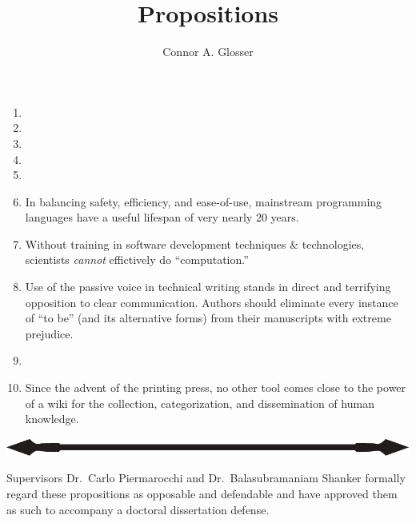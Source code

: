 \documentclass[]{tufte-book}
\title{Propositions}
\author{Connor A. Glosser}
\begin{document}
\maketitle

\begin{enumerate}

  \item
  \item
  \item
  \item
  \item
  \item In balancing safety, efficiency, and ease-of-use, mainstream programming languages have a useful lifespan of very nearly 20 years.
  \item Without training in software development techniques \& technologies, scientists \emph{cannot} effictively do ``computation.''
  \item Use of the passive voice in technical writing stands in direct and terrifying opposition to clear communication. Authors should eliminate every instance of ``to be'' (and its alternative forms) from their manuscripts with extreme prejudice.
  \item
  \item Since the advent of the printing press, no other tool comes close to the power of a wiki for the collection, categorization, and dissemination of human knowledge.

\end{enumerate}

\begin{center}
  \includegraphics[width=\textwidth]{spear_black.pdf}
\end{center}

\begin{center}
  Supervisors Dr.\ Carlo Piermarocchi and Dr.\ Balasubramaniam Shanker formally
  regard these propositions as opposable and defendable and have approved them
  as such to accompany a doctoral dissertation defense.
\end{center}
\end{document}
